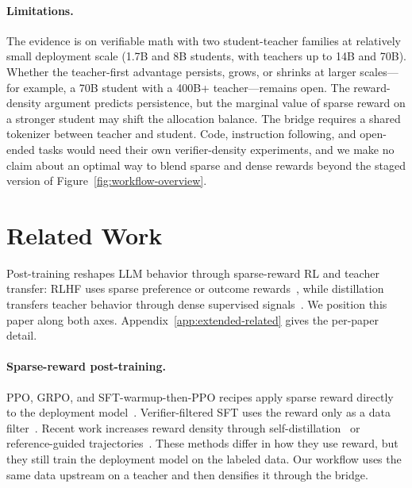 \documentclass{article}
\begin{document}
\paragraph{Limitations.} The evidence is on verifiable math with two student-teacher families at relatively small deployment scale (1.7B and 8B students, with teachers up to 14B and 70B). Whether the teacher-first advantage persists, grows, or shrinks at larger scales---for example, a 70B student with a 400B+ teacher---remains open. The reward-density argument predicts persistence, but the marginal value of sparse reward on a stronger student may shift the allocation balance. The bridge requires a shared tokenizer between teacher and student. Code, instruction following, and open-ended tasks would need their own verifier-density experiments, and we make no claim about an optimal way to blend sparse and dense rewards beyond the staged version of Figure~\ref{fig:workflow-overview}.

\section{Related Work}
\label{sec:related}

Post-training reshapes LLM behavior through sparse-reward RL and teacher transfer: RLHF uses sparse preference or outcome rewards~\citep{ouyang2022training,stiennon2020learning,bai2022training}, while distillation transfers teacher behavior through dense supervised signals~\citep{hinton2015distilling}. We position this paper along both axes. Appendix~\ref{app:extended-related} gives the per-paper detail.

\paragraph{Sparse-reward post-training.} PPO, GRPO, and SFT-warmup-then-PPO recipes apply sparse reward directly to the deployment model~\citep{schulman2017proximal,shao2024deepseekmath,luong2024reft}. Verifier-filtered SFT uses the reward only as a data filter~\citep{zelikman2022star,singh2024beyond}. Recent work increases reward density through self-distillation~\citep{he2026sdzero,yang2026rlsd} or reference-guided trajectories~\citep{wu2026regft}. These methods differ in how they use reward, but they still train the deployment model on the labeled data. Our workflow uses the same data upstream on a teacher and then densifies it through the bridge.
\end{document}
